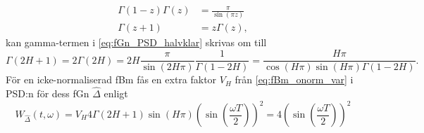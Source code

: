 \begin{align}
    \Gamma(1-z)\Gamma(z)&=\frac{\pi}{\sin(\pi z)} \\
    \Gamma(z+1)&=z\Gamma(z),
\end{align}
kan gamma-termen i \eqref{eq:fGn_PSD_halvklar} skrivas om till
\begin{equation}
    \Gamma(2H+1) = 2 \Gamma(2H) = 2H\frac{\pi}{\sin(2H\pi)}\frac{1}{\Gamma(1-2H)} = \frac{H\pi}{\cos(H\pi)\sin(H\pi)\Gamma(1-2H)}.
\end{equation}
För en icke-normaliserad fBm fås en extra faktor $V_H$ från \eqref{eq:fBm_onorm_var} i PSD:n för dess fGn $\hat{\Delta}$ enligt
\begin{equation}
    W_{\hat{\Delta}}(t,\omega) = V_H 4\Gamma{(2H+1)}\sin(H\pi)(\sin(\frac{\omega T}{2}))^2 = 4 (\sin(\frac{\omega T}{2}))^2
\end{equation}


